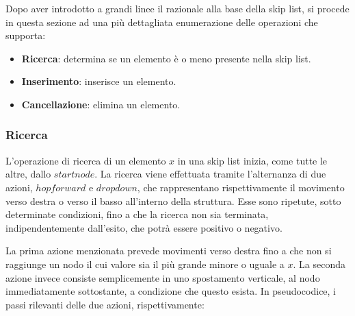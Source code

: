 %		

		Dopo aver introdotto a grandi linee il razionale alla base della skip list, si procede in questa sezione ad una più dettagliata enumerazione delle operazioni che supporta:
		\begin{itemize} 
			\item \textbf{Ricerca}: determina se un elemento è o meno presente nella skip list.
			\item \textbf{Inserimento}: inserisce un elemento.
			\item \textbf{Cancellazione}: elimina un elemento.
		\end{itemize} 
	
		\subsubsection{Ricerca}
			
			L'operazione di ricerca di un elemento $ x $ in una skip list inizia, come tutte le altre, dallo $start node$. La ricerca viene effettuata tramite l'alternanza di due azioni, $ hop forward $ e $ drop down $, che rappresentano rispettivamente il movimento verso destra o verso il basso all'interno della struttura. Esse sono ripetute, sotto determinate condizioni, fino a che la ricerca non sia terminata, indipendentemente dall'esito, che potrà essere positivo o negativo.
			
			La prima azione menzionata prevede movimenti verso destra fino a che non si raggiunge un nodo il cui valore sia il più grande minore o uguale a $ x $. La seconda azione invece consiste semplicemente in uno spostamento verticale, al nodo immediatamente sottostante, a condizione che questo esista.  In pseudocodice, i passi rilevanti delle due azioni, rispettivamente: 
			
